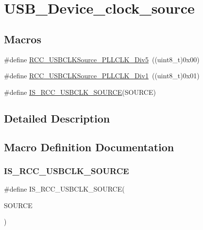 \hypertarget{group___u_s_b___device__clock__source}{}\section{U\+S\+B\+\_\+\+Device\+\_\+clock\+\_\+source}
\label{group___u_s_b___device__clock__source}
\subsection*{Macros}
\begin{DoxyCompactItemize}
\item 
\#define \mbox{\hyperlink{group___u_s_b___device__clock__source_ga5e7a39e25fc37fd2b90edfe66bf1f53f}{R\+C\+C\+\_\+\+U\+S\+B\+C\+L\+K\+Source\+\_\+\+P\+L\+L\+C\+L\+K\+\_\+Div5}}~((uint8\+\_\+t)0x00)
\item 
\#define \mbox{\hyperlink{group___u_s_b___device__clock__source_ga8162727793b5690d6b96ad0cc7ce3866}{R\+C\+C\+\_\+\+U\+S\+B\+C\+L\+K\+Source\+\_\+\+P\+L\+L\+C\+L\+K\+\_\+\+Div1}}~((uint8\+\_\+t)0x01)
\item 
\#define \mbox{\hyperlink{group___u_s_b___device__clock__source_ga484f7834b5506d9879ed84660c894250}{I\+S\+\_\+\+R\+C\+C\+\_\+\+U\+S\+B\+C\+L\+K\+\_\+\+S\+O\+U\+R\+CE}}(S\+O\+U\+R\+CE)
\end{DoxyCompactItemize}


\subsection{Detailed Description}


\subsection{Macro Definition Documentation}
\mbox{\label{group___u_s_b___device__clock__source_ga484f7834b5506d9879ed84660c894250}} 
\subsubsection{\texorpdfstring{IS\_RCC\_USBCLK\_SOURCE}{IS\_RCC\_USBCLK\_SOURCE}}
{\footnotesize\ttfamily \#define I\+S\+\_\+\+R\+C\+C\+\_\+\+U\+S\+B\+C\+L\+K\+\_\+\+S\+O\+U\+R\+CE(\begin{DoxyParamCaption}\item[{}]{S\+O\+U\+R\+CE }\end{DoxyParamCaption})}

